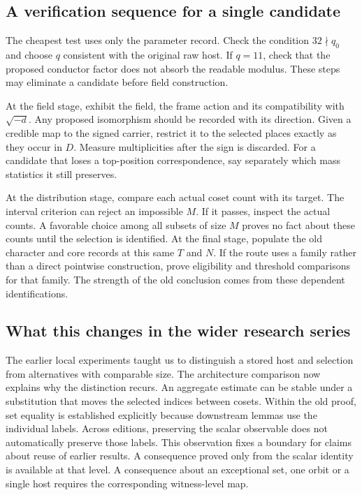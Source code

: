 \documentclass[12pt,letterpaper]{article}
\begin{document}
\subsection{A verification sequence for a single candidate}
The cheapest test uses only the parameter record. Check the condition $32\nmid q_0$ and choose $q$ consistent with the original raw host. If $q=11$, check that the proposed conductor factor does not absorb the readable modulus. These steps may eliminate a candidate before field construction.

At the field stage, exhibit the field, the frame action and its compatibility with $\sqrt{-d}$. Any proposed isomorphism should be recorded with its direction. Given a credible map to the signed carrier, restrict it to the selected places exactly as they occur in $D$. Measure multiplicities after the sign is discarded. For a candidate that loses a top-position correspondence, say separately which mass statistics it still preserves.

At the distribution stage, compare each actual coset count with its target. The interval criterion can reject an impossible $M$. If it passes, inspect the actual counts. A favorable choice among all subsets of size $M$ proves no fact about these counts until the selection is identified. At the final stage, populate the old character and core records at this same $T$ and $N$. If the route uses a family rather than a direct pointwise construction, prove eligibility and threshold comparisons for that family. The strength of the old conclusion comes from these dependent identifications.

\subsection{What this changes in the wider research series}
The earlier local experiments taught us to distinguish a stored host and selection from alternatives with comparable size. The architecture comparison now explains why the distinction recurs. An aggregate estimate can be stable under a substitution that moves the selected indices between cosets. Within the old proof, set equality is established explicitly because downstream lemmas use the individual labels. Across editions, preserving the scalar observable does not automatically preserve those labels. This observation fixes a boundary for claims about reuse of earlier results. A consequence proved only from the scalar identity is available at that level. A consequence about an exceptional set, one orbit or a single host requires the corresponding witness-level map.
\end{document}
